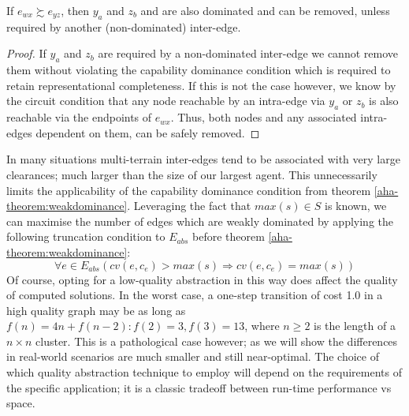\begin{corollary}
If $e_{wx} \succsim e_{yz}$, then $y_{a}$ and $z_{b}$ and are also dominated and can be removed, unless required by another (non-dominated) inter-edge. 
\end{corollary}
\begin{proof}
If $y_{a}$ and $z_{b}$ are required by a non-dominated inter-edge we cannot remove them without violating the capability dominance condition which is required to retain representational completeness. 
If this is not the case however, we know by the circuit condition that any node reachable by an intra-edge via $y_{a}$ or $z_{b}$ is also reachable via the endpoints of $e_{wx}$. 
Thus, both nodes and any associated intra-edges dependent on them, can be safely removed.
\end{proof}
In many situations multi-terrain inter-edges tend to be associated with very large clearances; much larger than the size of our largest agent.
This unnecessarily limits the applicability of the capability dominance condition from theorem \ref{aha-theorem:weakdominance}. 
Leveraging the fact that $max(s) \in S$ is known, we can maximise the number of edges which are weakly dominated by applying the following truncation condition to $E_{abs}$ before theorem \ref{aha-theorem:weakdominance}:
$$
\forall e \in E_{abs} (cv(e, c_{e}) > max(s) \Rightarrow cv(e, c_{e}) = max(s)) 
$$
Of course, opting for a low-quality abstraction in this way does affect the quality of computed solutions. 
In the worst case, a one-step transition of cost 1.0 in a high quality graph may be as long as $f(n) = 4n + f(n-2) : f(2) = 3, f(3) = 13$, where $n \geq 2$ is the length of a $n \times n$ cluster.
This is a pathological case however; as we will show the differences in real-world scenarios are much smaller and still near-optimal. 
The choice of which quality abstraction technique to employ will depend on the requirements of the specific application; it is a classic tradeoff between run-time performance vs space.
